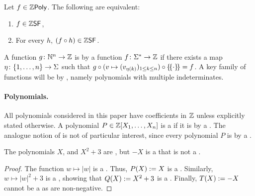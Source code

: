 \begin{lemma}
    \label{pre-compose-sf-commut:lemma}
    Let $f \in \ZPoly$.
    The following are equivalent:
    \begin{enumerate}
        \item $f \in \ZSF$,
        \item For every   $h$,
            $(f \circ h) \in \ZSF$.
    \end{enumerate}
\end{lemma}

\AP A function $g \colon \mathbb{N}^n \to \mathbb{Z}$ is  by a function
$f \colon \Sigma^* \to \mathbb{Z}$ if there exists a map $\eta \colon \mathopen{\{} 1, \dots,
n \mathclose{\}} \to \Sigma$ such that $g \circ (v \mapsto \seqof{v_{\eta(k)}}{1 \leq k \leq
n}) \circ \commute = f$. A key family of functions will be  by
, namely polynomials with multiple indeterminates.

\paragraph*{Polynomials.} \AP All polynomials considered in this paper have
coefficients in $\mathbb{Z}$ unless explicitly stated otherwise. A polynomial $P \in
\mathbb{Z}[X_1, \dots, X_n]$ is a  if it is
 by a . The analogue notion of
 is not of particular interest, since every
polynomial $P$ is  by a .

\begin{example}
    \label{negative-not-nrat:ex}
    The polynomials $X$, and $X^2 + 3$ are ,
    but $- X$ is a  that is 
    not a .
\end{example}
\begin{proof}
    The function $w \mapsto |w|$ is a .
    Thus, 
    $P(X) \mathrel{:=} X$ is
    a . Similarly,
    $w \mapsto |w|^2 + 3$ is a ,
    showing that $Q(X) \mathrel{:=} X^2 + 3$
    is a .
    Finally, 
    $T(X) \mathrel{:=} - X$ cannot be 
    a  as 
    are non-negative.
\end{proof}

